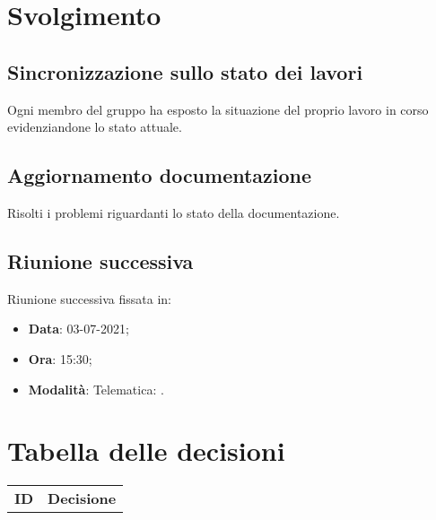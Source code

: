 \documentclass[]{article}
\begin{document}
	\newpage

	\section{Svolgimento}
		\subsection{Sincronizzazione sullo stato dei lavori}
		Ogni membro del gruppo ha esposto la situazione del proprio lavoro in corso evidenziandone lo stato attuale.\\
		
		\subsection{Aggiornamento documentazione}
		Risolti i problemi riguardanti lo stato della documentazione. \\
		
		\subsection{Riunione successiva}
		Riunione successiva fissata in:
		\begin{itemize}
			\item \textbf{Data}: 03-07-2021;
			\item \textbf{Ora}: 15:30;
			\item \textbf{Modalità}: Telematica: .
		\end{itemize}
	
	
\section{Tabella delle decisioni}

\begin{table} [h!]
	\begin{center}
		\begin{tabular} { m{2cm} m{14cm} }
			\rowcolor{lightgray}
			\textbf{ID} & \textbf{Decisione}\\
		\end{tabular}
	\end{center}
\end{table}
\end{document}
